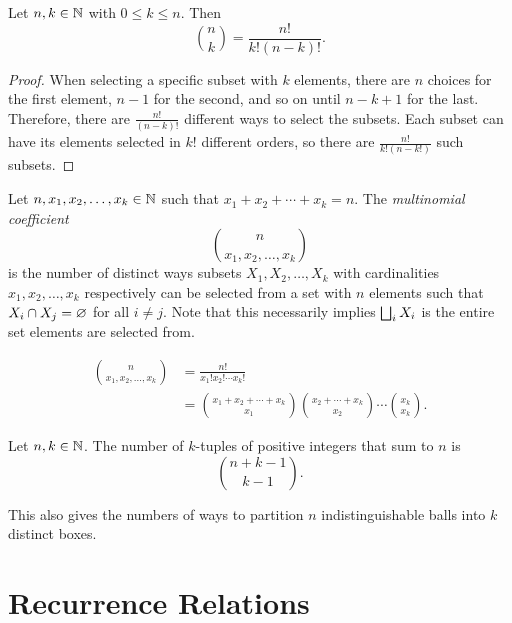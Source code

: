 \begin{prop}
    Let $n, k \in \mathbb{N}$ with $0 \leq k \leq n$. Then \[\binom{n}{k} = \frac{n!}{k!(n-k)!}.\]
\end{prop}

\begin{proof}
    When selecting a specific subset with $k$ elements, there are $n$ choices for the first element, $n-1$ for the second, and so on until $n-k+1$ for the last. Therefore, there are $\frac{n!}{(n-k)!}$ different ways to select the subsets. Each subset can have its elements selected in $k!$ different orders, so there are $\frac{n!}{k!(n-k!)}$ such subsets.
\end{proof}

\begin{defn}
    Let $n, x_1, x_2, \ldots, x_k \in \mathbb{N}$ such that $x_1 + x_2 + \cdots + x_k = n$. The \emph{multinomial coefficient} \[\binom{n}{x_1, x_2, \ldots, x_k}\] is the number of distinct ways subsets $X_1, X_2, \ldots, X_k$ with cardinalities $x_1, x_2, \ldots, x_k$ respectively can be selected from a set with $n$ elements such that $X_i \cap X_j = \varnothing$ for all $i \neq j$. Note that this necessarily implies $\bigsqcup_{i}X_i$ is the entire set elements are selected from.
\end{defn}

\begin{prop}
    \begin{align*}
        \binom{n}{x_1, x_2, \ldots, x_k} &= \frac{n!}{x_1!x_2!\cdots x_k!} \\ &= \binom{x_1 + x_2 + \cdots + x_k}{x_1}\binom{x_2 + \cdots + x_k}{x_2}\cdots\binom{x_k}{x_k}.
    \end{align*}
\end{prop}

\begin{prop}
    Let $n, k \in \mathbb{N}$. The number of $k$-tuples of positive integers that sum to $n$ is
    \[\binom{n + k - 1}{k - 1}.\]
\end{prop}

\begin{rmk}
    This also gives the numbers of ways to partition $n$ indistinguishable balls into $k$ distinct boxes.
\end{rmk}

\section{Recurrence Relations}

